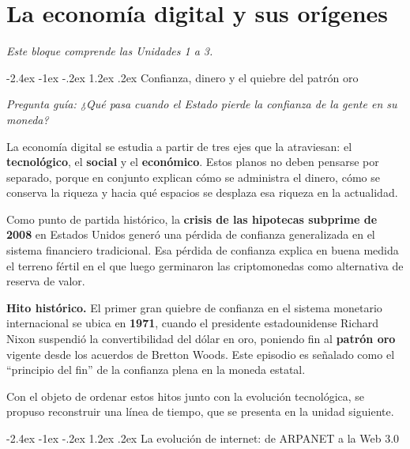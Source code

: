 \documentclass[12pt,oneside]{book}
\makeatletter
\renewcommand\section{\@startsection{section}{1}{\z@}%
  {-2.4ex \@plus -1ex \@minus -.2ex}%
  {1.2ex \@plus .2ex}%
  {\normalfont\Large\bfseries\color{blue!50!black}}}
\newcommand{\guia}[1]{\noindent\textit{Pregunta guía: #1}\par\smallskip}
\newcommand{\alcance}[1]{\noindent\textit{#1}\par\smallskip}
\makeatother
\begin{document}
\chapter{La economía digital y sus orígenes}

\alcance{Este bloque comprende las Unidades 1 a 3.}

\section{Confianza, dinero y el quiebre del patrón oro}

\guia{¿Qué pasa cuando el Estado pierde la confianza de la gente en su moneda?}

La economía digital se estudia a partir de tres ejes que la atraviesan: el \textbf{tecnológico}, el \textbf{social} y el \textbf{económico}. Estos planos no deben pensarse por separado, porque en conjunto explican cómo se administra el dinero, cómo se conserva la riqueza y hacia qué espacios se desplaza esa riqueza en la actualidad.

Como punto de partida histórico, la \textbf{crisis de las hipotecas subprime de 2008} en Estados Unidos generó una pérdida de confianza generalizada en el sistema financiero tradicional. Esa pérdida de confianza explica en buena medida el terreno fértil en el que luego germinaron las criptomonedas como alternativa de reserva de valor.

\begin{important}
\textbf{Hito histórico.} El primer gran quiebre de confianza en el sistema monetario internacional se ubica en \textbf{1971}, cuando el presidente estadounidense Richard Nixon suspendió la convertibilidad del dólar en oro, poniendo fin al \textbf{patrón oro} vigente desde los acuerdos de Bretton Woods. Este episodio es señalado como el ``principio del fin'' de la confianza plena en la moneda estatal.
\end{important}

Con el objeto de ordenar estos hitos junto con la evolución tecnológica, se propuso reconstruir una línea de tiempo, que se presenta en la unidad siguiente.

\section{La evolución de internet: de ARPANET a la Web 3.0}
\end{document}
